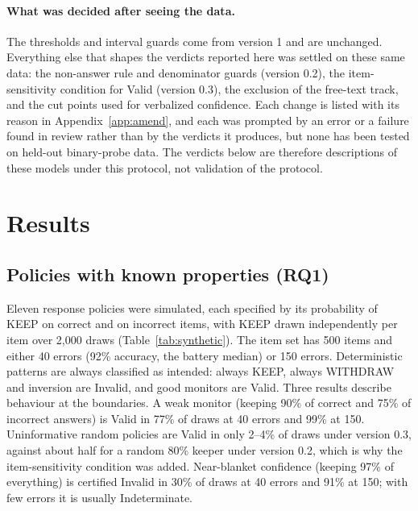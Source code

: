\documentclass[11pt,a4paper]{article}
\begin{document}
\paragraph{What was decided after seeing the data.} The thresholds and interval guards come from version 1 and are unchanged. Everything else that shapes the verdicts reported here was settled on these same data: the non-answer rule and denominator guards (version 0.2), the item-sensitivity condition for Valid (version 0.3), the exclusion of the free-text track, and the cut points used for verbalized confidence. Each change is listed with its reason in Appendix~\ref{app:amend}, and each was prompted by an error or a failure found in review rather than by the verdicts it produces, but none has been tested on held-out binary-probe data. The verdicts below are therefore descriptions of these models under this protocol, not validation of the protocol.

\section{Results}

\subsection{Policies with known properties (RQ1)}\label{sec:synth}

Eleven response policies were simulated, each specified by its probability of KEEP on correct and on incorrect items, with KEEP drawn independently per item over 2,000 draws (Table~\ref{tab:synthetic}). The item set has 500 items and either 40 errors (92\% accuracy, the battery median) or 150 errors. Deterministic patterns are always classified as intended: always KEEP, always WITHDRAW and inversion are Invalid, and good monitors are Valid. Three results describe behaviour at the boundaries. A weak monitor (keeping 90\% of correct and 75\% of incorrect answers) is Valid in 77\% of draws at 40 errors and 99\% at 150. Uninformative random policies are Valid in only 2--4\% of draws under version 0.3, against about half for a random 80\% keeper under version 0.2, which is why the item-sensitivity condition was added. Near-blanket confidence (keeping 97\% of everything) is certified Invalid in 30\% of draws at 40 errors and 91\% at 150; with few errors it is usually Indeterminate.
\end{document}
